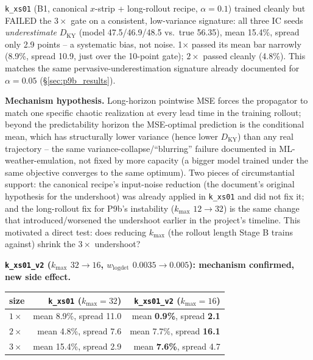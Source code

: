 \documentclass[11pt]{article}
\begin{document}
\texttt{k\_xs01} (B1, canonical $x$-strip + long-rollout recipe,
$\alpha{=}0.1$) trained cleanly but FAILED the $3\times$ gate on a
consistent, low-variance signature: all three IC seeds
\emph{underestimate} $D_{\mathrm{KY}}$ (model 47.5/46.9/48.5 vs.\ true
56.35), mean 15.4\%, spread only 2.9 points -- a systematic bias, not
noise. 1$\times$ passed its mean bar narrowly (8.9\%, spread 10.9, just
over the 10-point gate); $2\times$ passed cleanly (4.8\%). This matches
the same pervasive-underestimation signature already documented for
$\alpha{=}0.05$ (\S\ref{sec:p9b_results}).

\textbf{Mechanism hypothesis.} Long-horizon pointwise MSE forces the
propagator to match one specific chaotic realization at every lead time
in the training rollout; beyond the predictability horizon the
MSE-optimal prediction is the conditional mean, which has structurally
lower variance (hence lower $D_{\mathrm{KY}}$) than any real trajectory
-- the same variance-collapse/``blurring'' failure documented in
ML-weather-emulation, not fixed by more capacity (a bigger model trained
under the same objective converges to the same optimum). Two pieces of
circumstantial support: the canonical recipe's input-noise reduction
(the document's original hypothesis for the undershoot) was already
applied in \texttt{k\_xs01} and did not fix it; and the long-rollout fix
for P9b's instability ($k_{\max}$ $12\to32$) is the same change that
introduced/worsened the undershoot earlier in the project's timeline.
This motivated a direct test: does reducing $k_{\max}$ (the rollout
length Stage B trains against) shrink the $3\times$ undershoot?

\textbf{\texttt{k\_xs01\_v2} ($k_{\max}$ $32\to16$, $w_{\mathrm{logdet}}$
$0.0035\to0.005$): mechanism confirmed, new side effect.}

\begin{center}
\begin{tabular}{lrr}
\toprule
size & \texttt{k\_xs01} ($k_{\max}{=}32$) & \texttt{k\_xs01\_v2} ($k_{\max}{=}16$) \\
\midrule
$1\times$ & mean 8.9\%, spread 11.0 & mean \textbf{0.9\%}, spread \textbf{2.1} \\
$2\times$ & mean 4.8\%, spread 7.6  & mean 7.7\%, spread \textbf{16.1} \\
$3\times$ & mean 15.4\%, spread 2.9 & mean \textbf{7.6\%}, spread 4.7 \\
\bottomrule
\end{tabular}
\end{center}
\end{document}
